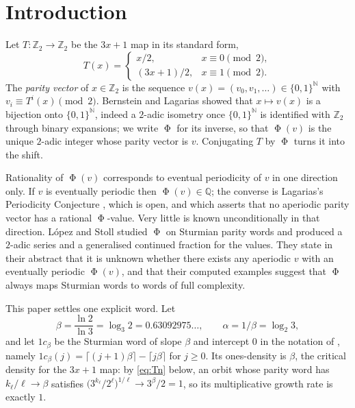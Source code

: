 \documentclass[11pt,reqno]{amsart}
\theoremstyle{plain}
\theoremstyle{definition}
\newcommand{\Zt}{\mathbb{Z}_2}
\newcommand{\Q}{\mathbb{Q}}
\newcommand{\N}{\mathbb{N}}
\DeclareMathOperator{\Ph}{\Phi}
\begin{document}
\begin{abstract}
What is new is the critical slope $\ln2/\ln3$, at every intercept, and one
elementary effective $2$-adic proof valid for all Sturmian words at once. Away
from that slope the conclusion for a word of ones-density $\gamma\ne\ln2/\ln3$
already follows from density results: Monks--Yazinski below, refereed, and
L\'opez--Stoll (2021) above, unpublished.
\end{abstract}

\maketitle

\section{Introduction}

Let $T\colon\Zt\to\Zt$ be the $3x+1$ map in its standard form,
\[
T(x)=\begin{cases} x/2, & x\equiv 0 \pmod 2,\\[2pt] (3x+1)/2, & x\equiv 1\pmod 2.\end{cases}
\]
The \emph{parity vector} of $x\in\Zt$ is the sequence
$v(x)=(v_0,v_1,\dots)\in\{0,1\}^{\N}$ with $v_i\equiv T^i(x)\pmod 2$. Bernstein
and Lagarias \cite{BernsteinLagarias1996,Bernstein1994} showed that
$x\mapsto v(x)$ is a bijection onto $\{0,1\}^{\N}$, indeed a $2$-adic isometry
once $\{0,1\}^{\N}$ is identified with $\Zt$ through binary expansions; we write
$\Ph$ for its inverse, so that $\Ph(v)$ is the unique $2$-adic integer whose
parity vector is $v$. Conjugating $T$ by $\Ph$ turns it into the shift.

Rationality of $\Ph(v)$ corresponds to eventual periodicity of $v$ in one
direction only. If $v$ is eventually periodic then $\Ph(v)\in\Q$; the converse is
Lagarias's Periodicity Conjecture \cite[\S 2]{Lagarias1985}, which is open, and
which asserts that no aperiodic parity vector has a rational $\Ph$-value. Very
little is known unconditionally in that direction. L\'opez and Stoll
\cite{LopezStoll2009} studied $\Ph$ on Sturmian parity words and produced a
$2$-adic series and a generalised continued fraction for the values. They state
in their abstract that it is unknown whether there exists any aperiodic $v$ with
an eventually periodic $\Ph(v)$, and that their computed examples suggest that
$\Ph$ always maps Sturmian words to words of full complexity.

This paper settles one explicit word. Let
\[
\beta=\frac{\ln 2}{\ln 3}=\log_3 2 = 0.63092975\ldots,\qquad \alpha=1/\beta=\log_2 3,
\]
and let $1c_\beta$ be the Sturmian word of slope $\beta$ and intercept $0$ in the
notation of \cite{LopezStoll2009}, namely $1c_\beta(j)=\lceil (j+1)\beta\rceil-\lceil
j\beta\rceil$ for $j\ge 0$. Its ones-density is $\beta$, the critical density for
the $3x+1$ map: by \eqref{eq:Tn} below, an orbit whose parity word has
$k_\ell/\ell\to\beta$ satisfies
$\bigl(3^{k_\ell}/2^{\ell}\bigr)^{1/\ell}\to 3^{\beta}/2=1$, so its
multiplicative growth rate is exactly $1$.
\end{document}
